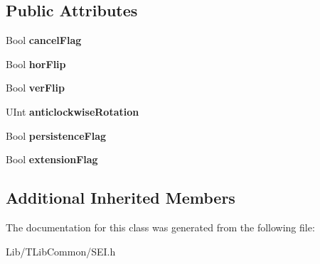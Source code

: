 \subsection*{Public Attributes}
\begin{DoxyCompactItemize}
\item 
\mbox{\label{class_s_e_i_display_orientation_acf8c84eb762c8f402567a0167265c5c5}} 
Bool {\bfseries cancel\+Flag}
\item 
\mbox{\label{class_s_e_i_display_orientation_ae3517659d75dc30822553c1da09246b5}} 
Bool {\bfseries hor\+Flip}
\item 
\mbox{\label{class_s_e_i_display_orientation_a24c1ad305be140b68b352f0fc0486b5c}} 
Bool {\bfseries ver\+Flip}
\item 
\mbox{\label{class_s_e_i_display_orientation_acd11227909e30b51d481540c70e82e93}} 
U\+Int {\bfseries anticlockwise\+Rotation}
\item 
\mbox{\label{class_s_e_i_display_orientation_a578c17b3cedb0f78be2ccf602a928004}} 
Bool {\bfseries persistence\+Flag}
\item 
\mbox{\label{class_s_e_i_display_orientation_aae5388d20448b1b21b08f340f760d431}} 
Bool {\bfseries extension\+Flag}
\end{DoxyCompactItemize}
\subsection*{Additional Inherited Members}


The documentation for this class was generated from the following file\+:\begin{DoxyCompactItemize}
\item 
Lib/\+T\+Lib\+Common/S\+E\+I.\+h\end{DoxyCompactItemize}
